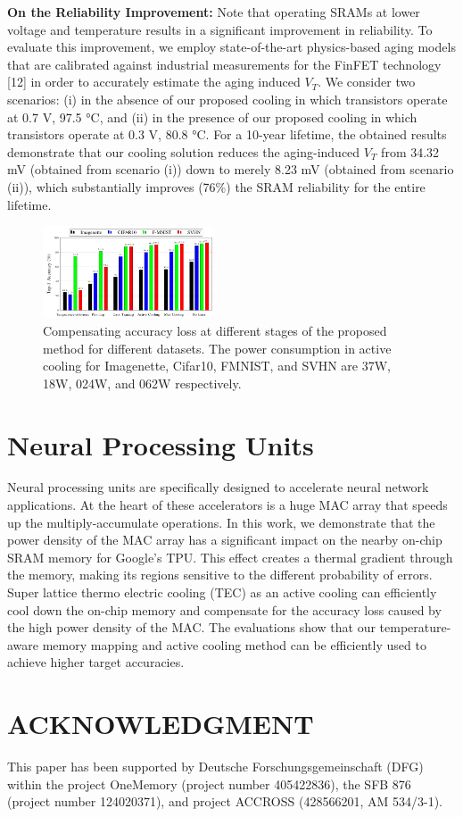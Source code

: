 \documentclass[sigconf]{acmart}
\begin{document}
\textbf{On the Reliability Improvement: }Note that operating SRAMs at lower voltage and temperature results in a significant improvement in reliability. To evaluate this improvement, we employ state-of-the-art physics-based aging models that are calibrated against industrial measurements for the FinFET technology [12] in order to accurately estimate the aging induced \( V_T \). We consider two scenarios: (i) in the absence of our proposed cooling in which transistors operate at 0.7 V, 97.5 °C, and (ii) in the presence of our proposed cooling in which transistors operate at 0.3 V, 80.8 °C. For a 10-year lifetime, the obtained results demonstrate that our cooling solution reduces the aging-induced \( V_T \) from 34.32 mV (obtained from scenario (i)) down to merely 8.23 mV (obtained from scenario (ii)), which substantially improves (76\%) the SRAM reliability for the entire lifetime.

\begin{figure}
    \centering
    \includegraphics[width=0.45\textwidth]{Figures/Picture4.png} 
    \caption{Compensating accuracy loss at different stages of the
 proposed method for different datasets. The power consumption
 in active cooling for Imagenette, Cifar10, FMNIST, and SVHN
 are 37W, 18W, 024W, and 062W respectively.}
    \label{Compensating accuracy loss at different stages of the
 proposed method for different datasets. The power consumption
 in active cooling for Imagenette, Cifar10, FMNIST, and SVHN
 are 37W, 18W, 024W, and 062W respectively.}
\end{figure}

\section{Neural Processing Units}

Neural processing units are specifically designed to accelerate neural network applications. At the heart of these accelerators is a huge MAC array that speeds up the multiply-accumulate operations. In this work, we demonstrate that the power density of the MAC array has a significant impact on the nearby on-chip SRAM memory for Google’s TPU. This effect creates a thermal gradient through the memory, making its regions sensitive to the different probability of errors. Super lattice thermo electric cooling (TEC) as an active cooling can efficiently cool down the on-chip memory and compensate for the accuracy loss caused by the high power density of the MAC. The evaluations show that our temperature-aware memory mapping and active cooling method can be efficiently used to achieve higher target accuracies.

\section*{ACKNOWLEDGMENT}

This paper has been supported by Deutsche Forschungsgemeinschaft (DFG) within the project OneMemory (project number 405422836), the SFB 876 (project number 124020371), and project ACCROSS (428566201, AM 534/3-1).



\end{document}
